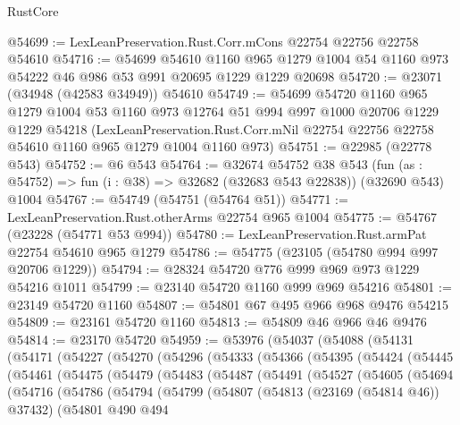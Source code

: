\begin{lexlean}{RustCore}
\begin{coremodule}
@54699 := LexLeanPreservation.Rust.Corr.mCons @22754 @22756 @22758 @54610
@54716 := @54699
    @54610
    @1160
    @965
    @1279
    @1004
    @54
    @1160
    @973
    @54222
    @46
    @986
    @53
    @991
    @20695
    @1229
    @1229
    @20698
@54720 := @23071 (@34948 (@42583 @34949)) @54610
@54749 := @54699
    @54720
    @1160
    @965
    @1279
    @1004
    @53
    @1160
    @973
    @12764
    @51
    @994
    @997
    @1000
    @20706
    @1229
    @1229
    @54218
    (LexLeanPreservation.Rust.Corr.mNil
      @22754
      @22756
      @22758
      @54610
      @1160
      @965
      @1279
      @1004
      @1160
      @973)
@54751 := @22985 (@22778 @543)
@54752 := @6 @543
@54764 := @32674
    @54752
    @38
    @543
    (fun (as : @54752) => fun (i : @38) => @32682 (@32683 @543 @22838))
    (@32690 @543)
    @1004
@54767 := @54749 (@54751 (@54764 @51))
@54771 := LexLeanPreservation.Rust.otherArms @22754 @965 @1004
@54775 := @54767 (@23228 (@54771 @53 @994))
@54780 := LexLeanPreservation.Rust.armPat @22754 @54610 @965 @1279
@54786 := @54775 (@23105 (@54780 @994 @997 @20706 @1229))
@54794 := @28324 @54720 @776 @999 @969 @973 @1229 @54216 @1011
@54799 := @23140 @54720 @1160 @999 @969 @54216
@54801 := @23149 @54720 @1160
@54807 := @54801 @67 @495 @966 @968 @9476 @54215
@54809 := @23161 @54720 @1160
@54813 := @54809 @46 @966 @46 @9476
@54814 := @23170 @54720
@54959 := @53976
    (@54037
      (@54088
        (@54131
          (@54171
            (@54227
              (@54270
                (@54296
                  (@54333
                    (@54366
                      (@54395
                        (@54424
                          (@54445
                            (@54461
                              (@54475
                                (@54479
                                  (@54483
                                    (@54487
                                      (@54491
                                        (@54527
                                          (@54605
                                            (@54694
                                              (@54716
                                                (@54786
                                                  (@54794
                                                    (@54799
                                                      (@54807
                                                        (@54813 (@23169 (@54814 @46)) @37432)
                                                        (@54801
                                                          @490
                                                          @494

\end{coremodule}
\end{lexlean}
